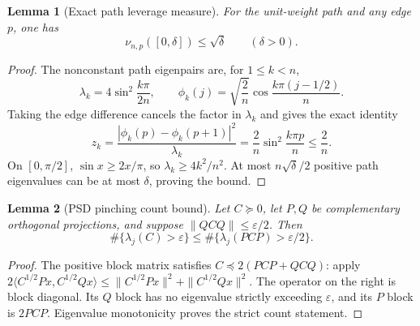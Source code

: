 \documentclass[11pt]{article}
\newtheorem{lemma}{Lemma}
\begin{document}
\begin{lemma}[Exact path leverage measure]\label{lem:measure}
For the unit-weight path and any edge $p$, one has
\[
 \nu_{n,p}([0,\delta])\le\sqrt\delta\qquad(\delta>0).
\]
\end{lemma}
\begin{proof}
The nonconstant path eigenpairs are, for $1\le k<n$,
\[
 \lambda_k=4\sin^2\frac{k\pi}{2n},\qquad
 \phi_k(j)=\sqrt{\frac2n}\cos\frac{k\pi(j-1/2)}n.
\]
Taking the edge difference cancels the factor in $\lambda_k$ and gives
the exact identity
\[
 z_k=\frac{|\phi_k(p)-\phi_k(p+1)|^2}{\lambda_k}
       =\frac2n\sin^2\frac{k\pi p}n\le\frac2n.
\]
On $[0,\pi/2]$, $\sin x\ge2x/\pi$, so
$\lambda_k\ge4k^2/n^2$. At most $n\sqrt\delta/2$ positive path
eigenvalues can be at most $\delta$, proving the bound.
\end{proof}

\begin{lemma}[PSD pinching count bound]\label{lem:pinch}
Let $C\succeq0$, let $P,Q$ be complementary orthogonal projections,
and suppose $\|QCQ\|\le\varepsilon/2$. Then
\[
 \#\{\lambda_j(C)>\varepsilon\}
 \le\#\{\lambda_j(PCP)>\varepsilon/2\}.
\]
\end{lemma}
\begin{proof}
The positive block matrix satisfies
$C\preceq2(PCP+QCQ)$: apply
$2\langle C^{1/2}Px,C^{1/2}Qx\rangle
\le\|C^{1/2}Px\|^2+\|C^{1/2}Qx\|^2$.
The operator on the right is block diagonal. Its $Q$ block has no
eigenvalue strictly exceeding $\varepsilon$, and its $P$ block is
$2PCP$. Eigenvalue monotonicity proves the strict count statement.
\end{proof}
\end{document}
